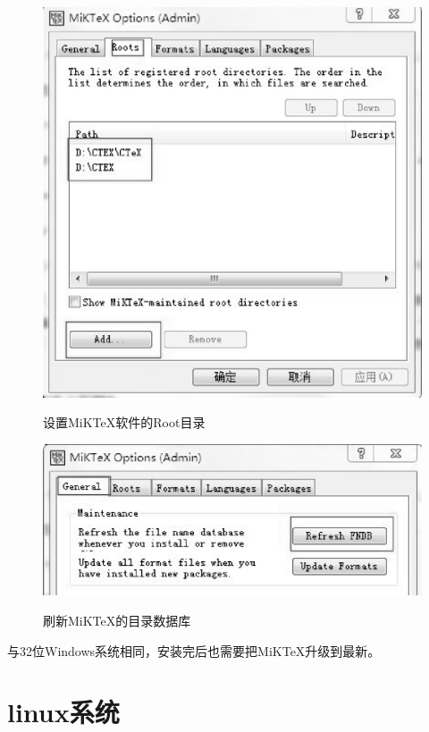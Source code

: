 \begin{figure}[thp]
\centering
\includegraphics[scale=0.5]{./Pictures/setroot.eps}\\
\caption{设置MiKTeX软件的Root目录}
\label{setroot}
\end{figure}

\begin{figure}[th]
\centering
\includegraphics[scale=0.5]{./Pictures/rffndb.eps}\\
\caption{刷新MiKTeX的目录数据库}
\label{rffndb}
\end{figure}

与32位Windows系统相同，安装完后也需要把MiKTeX升级到最新。

\section{linux系统}

